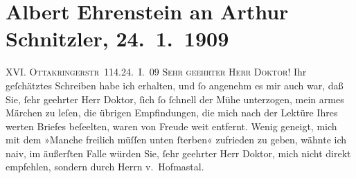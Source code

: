 

         
         \newcommand{\erwaehntePersonen}{Personen: Camill Hoffmann, Hugo von Hofmannsthal}
         \newcommand{\erwaehnteInstitutionen}{Institutionen: Erdgeist, Neue Freie Presse}
         \newcommand{\erwaehnteOrte}{Orte: Ottakringerstraße, Wien}
         \newcommand{\erwaehnteWerke}{Werke: Die Zeit, Manche freilich, Tai-Gin}
               \section[Albert Ehrenstein an Arthur Schnitzler, 24. 1. 1909]{ Albert Ehrenstein an Arthur Schnitzler, 24. 1. 1909}\nopagebreak{}\rehead{ }\begin{ledgroupsized}[t]{13cm}\normalsize\beginnumbering \toendnotes[C]{\smallbreak\pagebreak[2]} 
\toendnotes[C]{\smallbreak}\pstart
           {\pb}XVI. \textsc{Ottakringerstr} 114.\hfill 24. I. 09\pend
           \pstart{}\textsc{Sehr geehrter Herr Doktor!}\pend\pstart
           Ihr geſchätztes Schreiben habe ich erhalten, und ſo angenehm es mir auch war, daß
                    Sie, ſehr geehrter Herr Doktor, ſich ſo ſchnell der Mühe unterzogen, mein armes
                        Märchen zu leſen, die
                    übrigen Empfindungen, die mich nach der Lektüre Ihres werten Briefes beſeelten,
                    waren von Freude weit entfernt. Wenig geneigt, mich mit dem »Manche freilich müſſen unten ſterben«
                    zufrieden zu geben, wähnte ich naiv, im äußerſten Falle würden Sie, ſehr
                    geehrter Herr Doktor, mich nicht direkt empfehlen, sondern durch Herrn v. Hofma{\geminationn}stal.

\end{ledgroupsized}
